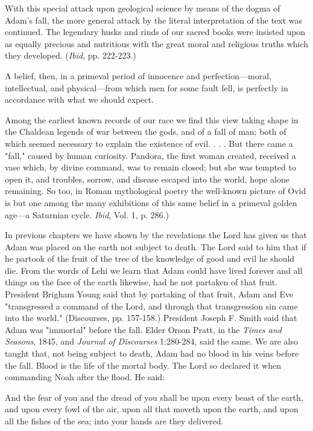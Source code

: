 With this special attack upon geological science by means of the dogma of Adam's fall, the
more general attack by the literal interpretation of the text was continued. The legendary
husks and rinds of our sacred books were insisted upon as equally precious and nutritious
with the great moral and religious truths which they developed. (\textit{Ibid}, pp. 222-223.)

A belief, then, in a primeval period of innocence and perfection—moral, intellectual, and
physical—from which men for some fault fell, is perfectly in accordance with what we
should expect.

Among the earliest known records of our race we find this view taking shape in the Chaldean
legends of war between the gods, and of a fall of man; both of which seemed necessary to
explain the existence of evil. . . . But there came a "fall," caused by human curiosity.
Pandora, the first woman created, received a vase which, by divine command, was to remain
closed; but she was tempted to open it, and troubles, sorrow, and disease escaped into the
world, hope alone remaining. So too, in Roman mythological poetry the well-known picture
of Ovid is but one among the many exhibitions of this same belief in a primeval golden
age—a Saturnian cycle. \textit{Ibid}, Vol. 1, p. 286.)

In previous chapters we have shown by the revelations the Lord has given us that Adam was
placed on the earth not subject to death. The Lord said to him that if he partook of the fruit of
the tree of the knowledge of good and evil he should die. From the words of Lehi we learn
that Adam could have lived forever and all things on the face of the earth likewise, had he
not partaken of that fruit. President Brigham Young said that by partaking of that fruit, Adam
and Eve "transgressed a command of the Lord, and through that transgression sin came into
the world." (Discourses, pp. 157-158.) President Joseph F. Smith said that Adam was
"immortal" before the fall. Elder Orson Pratt, in the \textit{Times and Seasons}, 1845, and \textit{Journal of
Discourses} 1:280-284, said the same. We are also taught that, not being subject to death,
Adam had no blood in his veins before the fall. Blood is the life of the mortal body. The Lord
so declared it when commanding Noah after the flood. He said:

And the fear of you and the dread of you shall be upon every beast of the earth, and upon
every fowl of the air, upon all that moveth upon the earth, and upon all the fishes of the sea;
into your hands are they delivered.

